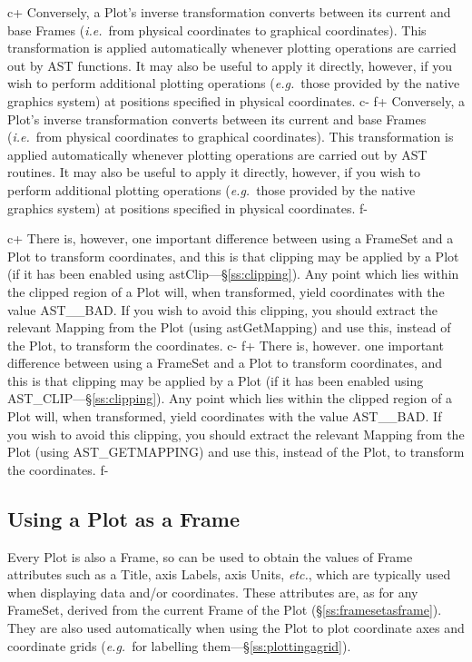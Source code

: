 \documentclass[twoside,11pt]{starlink}
\providecommand{\secref}[1]{\S\ref{#1}}
\begin{document}
c+
Conversely, a Plot's inverse transformation converts between its
current and base Frames (\emph{i.e.}\ from physical coordinates to
graphical coordinates). This transformation is applied automatically
whenever plotting operations are carried out by AST functions. It may
also be useful to apply it directly, however, if you wish to perform
additional plotting operations (\emph{e.g.}\ those provided by the
native graphics system) at positions specified in physical
coordinates.
c-
f+
Conversely, a Plot's inverse transformation converts between its
current and base Frames (\emph{i.e.}\ from physical coordinates to
graphical coordinates). This transformation is applied automatically
whenever plotting operations are carried out by AST routines. It may
also be useful to apply it directly, however, if you wish to perform
additional plotting operations (\emph{e.g.}\ those provided by the
native graphics system) at positions specified in physical
coordinates.
f-

c+
There is, however, one important difference between using a FrameSet
and a Plot to transform coordinates, and this is that clipping may be
applied by a Plot (if it has been enabled using
astClip---\secref{ss:clipping}). Any point which lies within the
clipped region of a Plot will, when transformed, yield coordinates
with the value AST\_\_BAD. If you wish to avoid this clipping, you
should extract the relevant Mapping from the Plot (using
astGetMapping) and use this, instead of the Plot, to transform the
coordinates.
c-
f+
There is, however. one important difference between using a FrameSet
and a Plot to transform coordinates, and this is that clipping may be
applied by a Plot (if it has been enabled using
AST\_CLIP---\secref{ss:clipping}). Any point which lies within the
clipped region of a Plot will, when transformed, yield coordinates
with the value AST\_\_BAD. If you wish to avoid this clipping, you
should extract the relevant Mapping from the Plot (using
AST\_GETMAPPING) and use this, instead of the Plot, to transform the
coordinates.
f-

\subsection{Using a Plot as a Frame}

Every Plot is also a Frame, so can be used to obtain the values of
Frame attributes such as a Title, axis Labels, axis Units,
\emph{etc.}, which are typically used when displaying data and/or
coordinates. These attributes are, as for any FrameSet, derived from
the current Frame of the Plot (\secref{ss:framesetasframe}). They are
also used automatically when using the Plot to plot coordinate axes
and coordinate grids (\emph{e.g.}\ for labelling
them---\secref{ss:plottingagrid}).
\end{document}
